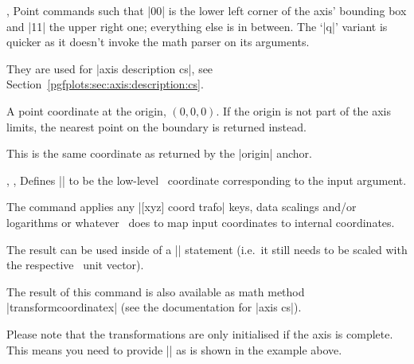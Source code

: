 \begin{commandlist}{%
	\pgfplotspointdescriptionxy{},%
	\pgfplotsqpointdescriptionxy{}}%
	Point commands such that |{0}{0}| is the lower left corner of the axis' bounding box and |{1}{1}| the upper right one; everything else is in between. The `|q|' variant is quicker as it doesn't invoke the math parser on its arguments.

	They are used for |axis description cs|, see Section~\ref{pgfplots:sec:axis:description:cs}.
\end{commandlist}

\begin{commandlist}{\pgfplotspointaxisorigin}
	A point coordinate at the origin, $(0,0,0)$. If the origin is not part of the axis limits, the nearest point on the boundary is returned instead.

	This is the same coordinate as returned by the |origin| anchor.
\end{commandlist}

\begin{commandlist}{%
	\pgfplotstransformcoordinatex{},%
	\pgfplotstransformcoordinatey{},%
	\pgfplotstransformcoordinatey{}}
	Defines |\pgfmathresult| to be the low-level \PGF\ coordinate corresponding to the input argument.

	The command applies any |[xyz] coord trafo| keys, data scalings and/or logarithms or whatever \PGFPlots\ does to map input coordinates to internal coordinates.

	The result can be used inside of a |\pgfpointxy| statement (i.e.\ it still needs to be scaled with the respective \PGF\ unit vector).
\begin{codeexample}[]
\end{codeexample}
	The result of this command is also available as math method |transformcoordinatex| (see the documentation for |axis cs|).

	Please note that the transformations are only initialised if the axis is complete. This means you need to provide |\pgfplotsextra| as is shown in the example above.
\end{commandlist}

